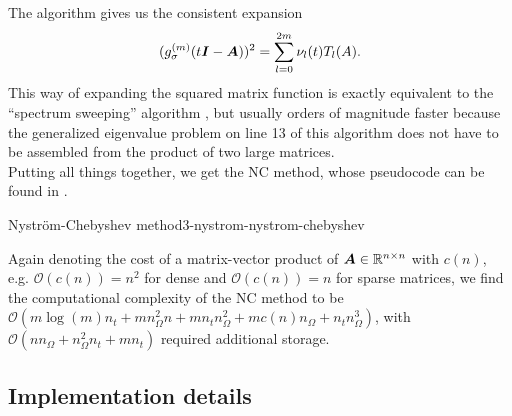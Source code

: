 The algorithm gives us the consistent expansion
\begin{equation}
    (g_{\sigma}^{(m)}(t\boldsymbol{I} - \boldsymbol{A}))^2 = \sum_{l=0}^{2m} \nu_l(t) T_l(A).
    \label{equ:3-nystrom-consistent-chebyshev-expansion}
\end{equation}
This way of expanding the squared matrix function
is exactly equivalent to the \enquote{spectrum sweeping}
algorithm \cite[algorithm~5]{lin2017randomized}, but
usually orders of magnitude faster because the generalized eigenvalue problem
on line 13 of this algorithm does not have to be assembled from the
product of two large matrices.\\


Putting all things together, we get the \gls{NC} method, whose pseudocode
can be found in .
\begin{algo}{Nystr\"om-Chebyshev method}{3-nystrom-nystrom-chebyshev}
    
\end{algo}

Again denoting the cost of a matrix-vector product of $\boldsymbol{A} \in \mathbb{R}^{n \times n}$
with $c(n)$, e.g. $\mathcal{O}(c(n)) = n^2$ for dense and $\mathcal{O}(c(n)) = n$
for sparse matrices, we find the computational complexity of the \gls{NC}
method to be $\mathcal{O}(m \log(m) n_t + m n_{\Omega}^2 n + m n_t n_{\Omega}^2 +  m c(n) n_{\Omega} + n_t n_{\Omega}^3)$, with
$\mathcal{O}(n n_{\Omega} + n_{\Omega}^2 n_t + m n_t)$ required additional storage.


\subsection{Implementation details}
\label{subsec:3-nystrom-implementation-details}

